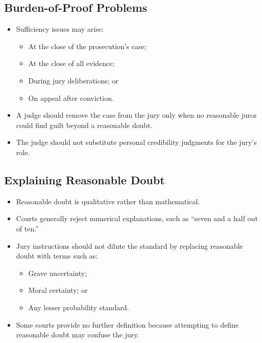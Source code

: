 \documentclass[11pt]{tex/lawoutline}
\begin{document}
\subsection{Burden-of-Proof Problems}{
\begin{itemize}
    \item Sufficiency issues may arise:
    \begin{itemize}
        \item At the close of the prosecution's case;
        \item At the close of all evidence;
        \item During jury deliberations; or
        \item On appeal after conviction.
    \end{itemize}
    \item A judge should remove the case from the jury only when no reasonable juror could find guilt beyond a reasonable doubt.
    \item The judge should not substitute personal credibility judgments for the jury's role.
\end{itemize}
}

\subsection{Explaining Reasonable Doubt}{
\begin{itemize}
    \item Reasonable doubt is qualitative rather than mathematical.
    \item Courts generally reject numerical explanations, such as ``seven and a half out of ten.''
    \item Jury instructions should not dilute the standard by replacing reasonable doubt with terms such as:
    \begin{itemize}
        \item Grave uncertainty;
        \item Moral certainty; or
        \item Any lesser probability standard.
    \end{itemize}
    \item Some courts provide no further definition because attempting to define reasonable doubt may confuse the jury.
\end{itemize}
}

\end{document}
